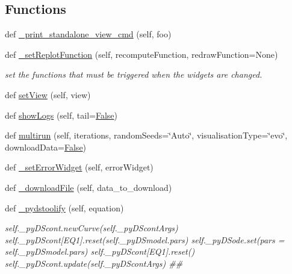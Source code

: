 \subsection*{Functions}
\begin{DoxyCompactItemize}
\item 
def \hyperlink{namespace_mu_mo_t_1_1_mu_mo_t_a0340f6a199b93abca5349e53ab69519b}{\+\_\+print\+\_\+standalone\+\_\+view\+\_\+cmd} (self, foo)
\item 
def \hyperlink{namespace_mu_mo_t_1_1_mu_mo_t_a3fa59b061bb48c50c225a54e411aaef3}{\+\_\+set\+Replot\+Function} (self, recompute\+Function, redraw\+Function=None)
\begin{DoxyCompactList}\small\item\em set the functions that must be triggered when the widgets are changed. \end{DoxyCompactList}\item 
def \hyperlink{namespace_mu_mo_t_1_1_mu_mo_t_a6a8b6010ea0b9546c31a8fe3dab569a8}{set\+View} (self, view)
\item 
def \hyperlink{namespace_mu_mo_t_1_1_mu_mo_t_a58d2e2ca35d16fb9b24088b4671a22fd}{show\+Logs} (self, tail=\hyperlink{namespace_mu_mo_t_1_1_mu_mo_t_a36cde68b055f3f2ee671020af4ccf4e2}{False})
\item 
def \hyperlink{namespace_mu_mo_t_1_1_mu_mo_t_ab99dde320291a23aecfd89f34bf3bf6c}{multirun} (self, iterations, random\+Seeds=\char`\"{}Auto\char`\"{}, visualisation\+Type=\char`\"{}evo\char`\"{}, download\+Data=\hyperlink{namespace_mu_mo_t_1_1_mu_mo_t_a36cde68b055f3f2ee671020af4ccf4e2}{False})
\item 
def \hyperlink{namespace_mu_mo_t_1_1_mu_mo_t_aeed5088d916518ff1211a12ffe7da89a}{\+\_\+set\+Error\+Widget} (self, error\+Widget)
\item 
def \hyperlink{namespace_mu_mo_t_1_1_mu_mo_t_a210fe44f54aa4ebdd4096c36366194ab}{\+\_\+download\+File} (self, data\+\_\+to\+\_\+download)
\item 
def \hyperlink{namespace_mu_mo_t_1_1_mu_mo_t_aa92c55a994d799a87d6bc8e0b08372ba}{\+\_\+pydstoolify} (self, equation)
\begin{DoxyCompactList}\small\item\em self.\+\_\+py\+D\+Scont.\+new\+Curve(self.\+\_\+py\+D\+Scont\+Args) self.\+\_\+py\+D\+Scont\mbox{[}\textquotesingle{}E\+Q1\textquotesingle{}\mbox{]}.reset(self.\+\_\+py\+D\+Smodel.\+pars) self.\+\_\+py\+D\+Sode.\+set(pars = self.\+\_\+py\+D\+Smodel.\+pars) self.\+\_\+py\+D\+Scont\mbox{[}\textquotesingle{}E\+Q1\textquotesingle{}\mbox{]}.reset() self.\+\_\+py\+D\+Scont.\+update(self.\+\_\+py\+D\+Scont\+Args) \#\# \end{DoxyCompactList}\item 

\end{DoxyCompactItemize}
